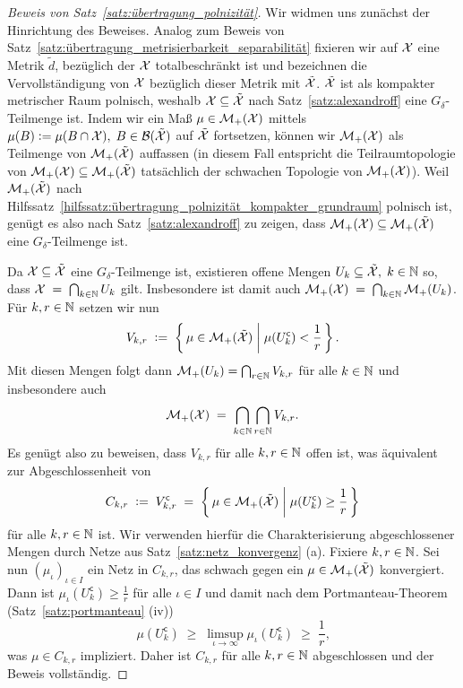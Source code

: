 \documentclass[../main/main.tex]{subfiles}
\begin{document}
	\begin{proof}[Beweis von Satz~\ref{satz:übertragung_polnizität}]
		Wir widmen uns zunächst der Hinrichtung des Beweises. Analog zum Beweis von Satz~\ref{satz:übertragung_metrisierbarkeit_separabilität} fixieren wir auf 
		$\mathcal{X}$ eine Metrik $\tilde{d}$, bezüglich der $\mathcal{X}$ totalbeschränkt ist und
		bezeichnen die Vervollständigung von $\mathcal{X}$ bezüglich dieser Metrik mit $\tilde{\mathcal{X}}$. $\tilde{\mathcal{X}}$ ist als kompakter metrischer Raum polnisch, weshalb $\mathcal{X} \subseteq \tilde{\mathcal{X}}$
		nach Satz~\ref{satz:alexandroff} eine $G_\delta$-Teilmenge ist. Indem wir ein Maß $\mu \in \mathcal{M}_{+}(\mathcal{X})$ mittels 
		$\mu(B) \vcentcolon = \mu(B \cap \mathcal{X}), \; B \in \mathcal{B}(\tilde{\mathcal{X}})$ auf $\tilde{\mathcal{X}}$ fortsetzen, können wir $\mathcal{M}_{+}(\mathcal{X})$ als Teilmenge von $\mathcal{M}_{+}(\tilde{\mathcal{X}})$
		auffassen (in diesem Fall entspricht die Teilraumtopologie von $\mathcal{M}_{+}(\mathcal{X}) \subseteq \mathcal{M}_{+}(\tilde{\mathcal{X}})$ tatsächlich der schwachen Topologie von $\mathcal{M}_{+}(\mathcal{X})$). Weil $\mathcal{M}_{+}(\tilde{\mathcal{X}})$ nach 
		Hilfssatz~\ref{hilfssatz:übertragung_polnizität_kompakter_grundraum} polnisch ist, genügt es also nach Satz~\ref{satz:alexandroff} zu zeigen, 
		dass $\mathcal{M}_{+}(\mathcal{X}) \subseteq \mathcal{M}_{+}(\tilde{\mathcal{X}})$ eine $G_\delta$-Teilmenge ist.
		
		Da $\mathcal{X} \subseteq \tilde{\mathcal{X}}$ eine $G_\delta$-Teilmenge ist, existieren offene Mengen $U_k \subseteq \tilde{\mathcal{X}}, \; k \in \mathbb{N}$ so, dass 
		$\mathcal{X} \; = \; \bigcap_{k \in \mathbb{N}} U_k$
		gilt. Insbesondere ist damit auch
		$\mathcal{M}_{+}(\mathcal{X}) \; = \; \bigcap_{k \in \mathbb{N}} \mathcal{M}_{+}(U_k)$.
		Für $k, r \in \mathbb{N}$ setzen wir nun
		\[ V_{k, r} \; \vcentcolon = \; \left\{\, \mu \in \mathcal{M}_{+}(\tilde{\mathcal{X}}) \; \middle| \; \mu(U_k^{\mathsf{c}}) < \frac{1}{r} \,\right\} \text{.} \]
		Mit diesen Mengen folgt dann $\mathcal{M}_{+}(U_k) = \bigcap_{r \in \mathbb{N}} V_{k, r}$ für alle $k \in \mathbb{N}$ und insbesondere auch
		\[ \mathcal{M}_{+}(\mathcal{X}) \; = \; \bigcap_{k \in \mathbb{N}} \bigcap_{r \in \mathbb{N}} V_{k, r} \text{.} \]
		Es genügt also zu beweisen, dass $V_{k, r}$ für alle $k, r \in \mathbb{N}$ offen ist, was äquivalent zur Abgeschlossenheit von 
		\[C_{k, r} \; \vcentcolon = \; V_{k, r}^{\mathsf{c}} \; = \; \left\{\, \mu \in \mathcal{M}_{+}(\tilde{\mathcal{X}}) \; \middle| \; \mu(U_k^{\mathsf{c}}) \geq \frac{1}{r} \,\right\} \] 
		für alle $k, r \in \mathbb{N}$ ist. Wir verwenden hierfür die Charakterisierung abgeschlossener Mengen durch Netze aus Satz~\ref{satz:netz_konvergenz} (a).
		Fixiere $k, r \in \mathbb{N}$. Sei nun $(\mu_\iota)_{\iota \in I}$ ein Netz in $C_{k, r}$, das schwach gegen ein $\mu \in \mathcal{M}_{+}(\tilde{\mathcal{X}})$ konvergiert.
		Dann ist $\mu_\iota(U_k^{\mathsf{c}}) \geq \frac{1}{r}$ für alle $\iota \in I$ und damit nach dem Portmanteau-Theorem (Satz~\ref{satz:portmanteau} (iv))
		\[ \mu(U_k^{\mathsf{c}}) \; \geq \; \limsup_{\iota \to \infty} \mu_\iota(U_k^{\mathsf{c}}) \; \geq \; \frac{1}{r} \text{,} \]
		was $\mu \in C_{k, r}$ impliziert. Daher ist $C_{k, r}$ für alle $k, r \in \mathbb{N}$ abgeschlossen und der Beweis vollständig.
		

\end{proof}
\end{document}
